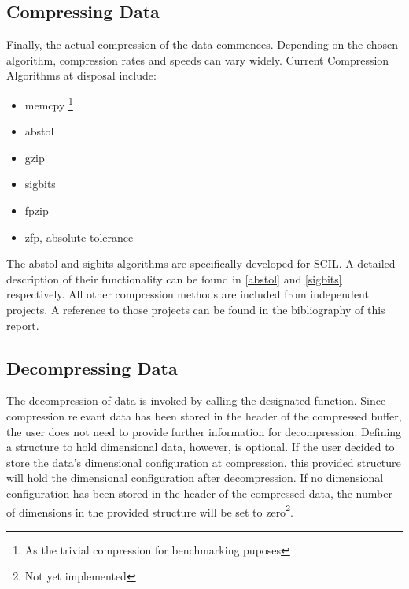 \documentclass[
	12pt,
	a4paper,
	BCOR10mm,
	DIV14,
	headsepline,
]{scrreprt}
\begin{document}
\bigskip

\subsection{Compressing Data}
\label{comp_data}

\bigskip

Finally, the actual compression of the data commences. Depending on the chosen
algorithm, compression rates and speeds can vary widely. Current Compression
Algorithms at disposal include:

\bigskip

\begin{itemize}
	\item memcpy \footnote{As the trivial compression for benchmarking puposes}
	\item abstol
	\item gzip
	\item sigbits
	\item fpzip
	\item zfp, absolute tolerance
\end{itemize}

\setcounter{footnote}{0}

\bigskip

The abstol and sigbits algorithms are specifically developed for SCIL. A
detailed description of their functionality can be found in \cref{abstol} and
\cref{sigbits} respectively. All other compression methods are included from
independent projects. A reference to those projects can be found in the
bibliography of this report.

\clearpage

\subsection{Decompressing Data}

\bigskip

The decompression of data is invoked by calling the designated function. Since
compression relevant data has been stored in the header of the compressed
buffer, the user does not need to provide further information for decompression.
Defining a structure to hold dimensional data, however, is optional. If the user
decided to store the data's dimensional configuration at compression, this
provided structure will hold the dimensional configuration after decompression.
If no dimensional configuration has been stored in the header of the compressed
data, the number of dimensions in the provided structure will be set to
zero\footnote{Not yet implemented}.
\end{document}
